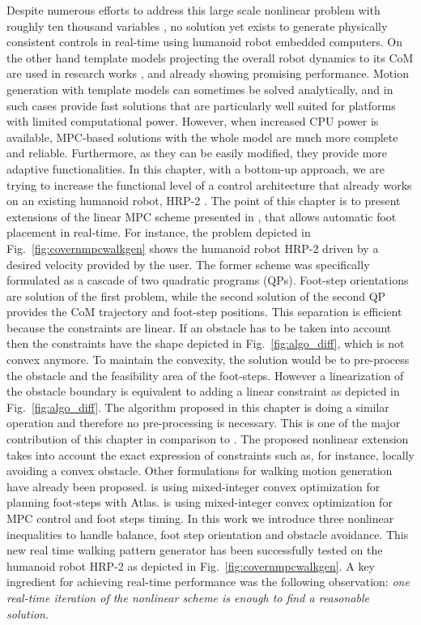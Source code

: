 Despite numerous efforts to address this large scale nonlinear problem with roughly ten thousand variables \cite{Koenemann:iros:2015,Dai:ICHR:2014}, no solution yet exists to generate physically consistent controls in real-time using humanoid robot embedded computers.
On the other hand template models projecting the overall robot dynamics to its CoM are used in research works \cite{Wensing:iros:2014,Orin:AURO:2012,Kajita:icra:2003,Englsberger:ichr:2015}, and already showing promising performance.
Motion generation with template models can sometimes be solved analytically, and in such cases provide fast solutions that are particularly well suited for platforms with limited computational power.
However, when increased CPU power is available, MPC-based solutions with the whole model are much more complete and reliable.
Furthermore, as they can be easily modified, they provide more adaptive functionalities.
In this chapter, with a bottom-up approach, we are trying to increase the functional level of a control architecture that already works on an existing humanoid robot, HRP-2 \cite{herdt:iros:2010}.
The point of this chapter is to present extensions of the linear MPC scheme presented in \cite{herdt:iros:2010}, that allows automatic foot placement in real-time.
For instance, the problem depicted in Fig.~\ref{fig:covernmpcwalkgen} shows the humanoid robot HRP-2 driven by a desired velocity provided by the user.
The former scheme \cite{herdt:iros:2010} was specifically formulated as a cascade of two quadratic programs (QPs). Foot-step orientations are solution of the first problem, while the second solution of the second QP provides the CoM trajectory and foot-step positions. This separation is efficient because the constraints are linear.
If an obstacle has to be taken into account then the constraints have the shape depicted in Fig.~\ref{fig:algo_diff}, which is not convex anymore.
To maintain the convexity, the solution would be to pre-process the obstacle and the feasibility area of the foot-steps.
However a linearization of the obstacle boundary is equivalent to adding a linear constraint as depicted in Fig.~\ref{fig:algo_diff}.
The algorithm proposed in this chapter is doing a similar operation and therefore no pre-processing is necessary.
This is one of the major contribution of this chapter in comparison to \cite{herdt:iros:2010}.
The proposed nonlinear extension takes into account the exact expression of constraints such as, for instance, locally avoiding a convex obstacle.
Other formulations for walking motion generation have already been proposed.
\cite{deits:ichr:14} is using mixed-integer convex optimization for planning foot-steps with Atlas.
\cite{Ibanez:ark:14} is using mixed-integer convex optimization for MPC control and foot steps timing.
In this work we introduce three nonlinear inequalities to handle balance, foot step orientation and obstacle avoidance.
This new real time walking pattern generator has been successfully tested on the humanoid robot HRP-2 as depicted in Fig.~\ref{fig:covernmpcwalkgen}.
A key ingredient for achieving real-time performance was the following observation: \emph{one real-time iteration of the nonlinear scheme is enough to find a reasonable solution}.

